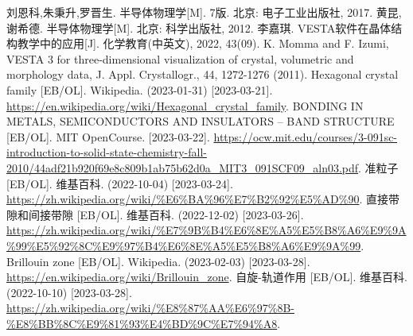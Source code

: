 \begin{thebibliography}{99}%
     刘恩科,朱秉升,罗晋生. 半导体物理学[M]. 7版. 北京: 电子工业出版社, 2017.
     黄昆,谢希德. 半导体物理学[M]. 北京: 科学出版社, 2012.
     李嘉琪. VESTA软件在晶体结构教学中的应用[J]. 化学教育(中英文), 2022, 43(09).
     K. Momma and F. Izumi, VESTA 3 for three-dimensional visualization of crystal, volumetric and morphology data, J. Appl. Crystallogr., 44, 1272-1276 (2011).
     Hexagonal crystal family [EB/OL]. Wikipedia. (2023-01-31) [2023-03-21].\\ \url{https://en.wikipedia.org/wiki/Hexagonal_crystal_family}.
     BONDING IN METALS, SEMICONDUCTORS AND
    INSULATORS – BAND STRUCTURE [EB/OL]. MIT OpenCourse. [2023-03-22]. \url{https://ocw.mit.edu/courses/3-091sc-introduction-to-solid-state-chemistry-fall-2010/44adf21b920f69e8c809b1ab75b62d0a_MIT3_091SCF09_aln03.pdf}.
     准粒子 [EB/OL]. 维基百科. (2022-10-04) [2023-03-24].\\ \url{https://zh.wikipedia.org/wiki/%E6%BA%96%E7%B2%92%E5%AD%90}.
     直接带隙和间接带隙 [EB/OL]. 维基百科. (2022-12-02) [2023-03-26].\\ \url{https://zh.wikipedia.org/wiki/%E7%9B%B4%E6%8E%A5%E5%B8%A6%E9%9A%99%E5%92%8C%E9%97%B4%E6%8E%A5%E5%B8%A6%E9%9A%99}.
     Brillouin zone [EB/OL]. Wikipedia. (2023-02-03) [2023-03-28].\\ \url{https://en.wikipedia.org/wiki/Brillouin_zone}.
     自旋-轨道作用 [EB/OL]. 维基百科. (2022-10-10) [2023-03-28].\\ \url{https://zh.wikipedia.org/wiki/%E8%87%AA%E6%97%8B-%E8%BB%8C%E9%81%93%E4%BD%9C%E7%94%A8}.
\end{thebibliography}
